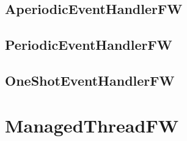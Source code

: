 \documentclass{article}
\begin{document}
\subsection{AperiodicEventHandlerFW}

\newpage

\subsection{PeriodicEventHandlerFW}

\newpage

\subsection{OneShotEventHandlerFW}

\newpage

\section{ManagedThreadFW}

\newpage



\end{document}
